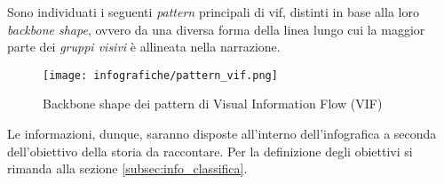 Sono individuati i seguenti \emph{pattern} principali di \gls{vif}, distinti in base alla loro \emph{backbone shape}, ovvero da una diversa forma della linea lungo cui la 
maggior parte dei \emph{gruppi visivi} è allineata nella narrazione.
\begin{figure}[H] 
    \centering 
    \texttt{[image: infografiche/pattern\_vif.png]} 
    \caption{Backbone shape dei pattern di Visual Information Flow (VIF)}
    \label{fig:pattern_vif}
\end{figure}

\bigskip
\noindent Le informazioni, dunque, saranno disposte all'interno dell'infografica a seconda dell'obiettivo della storia da raccontare.
Per la definizione degli obiettivi si rimanda alla sezione \ref{subsec:info_classifica}.

